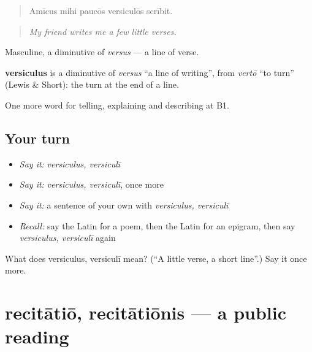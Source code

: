 \begin{quote}
Amīcus mihi paucōs versiculōs scrībit.
\end{quote}

\begin{quote}
\emph{My friend writes me a few little verses.}
\end{quote}

Masculine, a diminutive of \emph{versus} — a line of verse.

\begin{cousinweb}
\textbf{versiculus} is a diminutive of \emph{versus} \textquotedblleft{}a line of writing\textquotedblright{}, from \emph{vertō} \textquotedblleft{}to turn\textquotedblright{} (Lewis \& Short): the turn at the end of a line.
\end{cousinweb}

\begin{grammarlens}[title={What you've built}]
One more word for telling, explaining and describing at B1.
\end{grammarlens}

\subsection*{Your turn}
\begin{itemize}
\raggedright
  \item \emph{Say it:} \emph{versiculus, versiculī}
  \item \emph{Say it:} \emph{versiculus, versiculī}, once more
  \item \emph{Say it:} a sentence of your own with \emph{versiculus, versiculī}
  \item \emph{Recall:} say the Latin for a poem, then the Latin for an epigram, then say \emph{versiculus, versiculī} again
\end{itemize}

\begin{tcolorbox}[breakable,colback=teal!4,colframe=teal!35!black,title={Before you move on}]
What does versiculus, versiculī mean? (\textquotedblleft{}A little verse, a short line\textquotedblright{}.) Say it once more.
\end{tcolorbox}
\section[recitātiō, recitātiōnis]{recitātiō, recitātiōnis — a public reading}

\label{lesson:LA-C549-recitatio}



